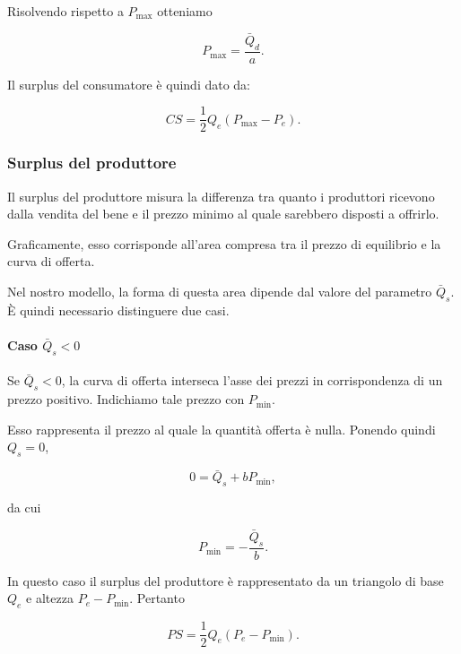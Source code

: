 Risolvendo rispetto a $P_{\max}$ otteniamo

\begin{equation*}
P_{\max}=\frac{\bar Q_d}{a}.
\end{equation*}

Il surplus del consumatore è quindi dato da:

\begin{equation*}
CS=
\frac{1}{2}Q_e(P_{\max}-P_e).
\end{equation*}


\subsubsection{Surplus del produttore}

Il surplus del produttore misura la differenza tra quanto i
produttori ricevono dalla vendita del bene e il prezzo minimo
al quale sarebbero disposti a offrirlo.

Graficamente, esso corrisponde all'area compresa tra il prezzo
di equilibrio e la curva di offerta.

Nel nostro modello, la forma di questa area dipende dal valore
del parametro $\bar Q_s$. È quindi necessario distinguere due
casi.


\paragraph{Caso $\bar Q_s<0$}

Se $\bar Q_s<0$, la curva di offerta interseca l'asse dei prezzi
in corrispondenza di un prezzo positivo. Indichiamo tale prezzo
con $P_{\min}$.

Esso rappresenta il prezzo al quale la quantità offerta è nulla.
Ponendo quindi $Q_s=0$,

\begin{equation*}
0=\bar Q_s+bP_{\min},
\end{equation*}

da cui

\begin{equation*}
P_{\min}=-\frac{\bar Q_s}{b}.
\end{equation*}

In questo caso il surplus del produttore è rappresentato da un
triangolo di base $Q_e$ e altezza $P_e-P_{\min}$. Pertanto

\begin{equation*}
PS=
\frac{1}{2}Q_e(P_e-P_{\min}).
\end{equation*}

